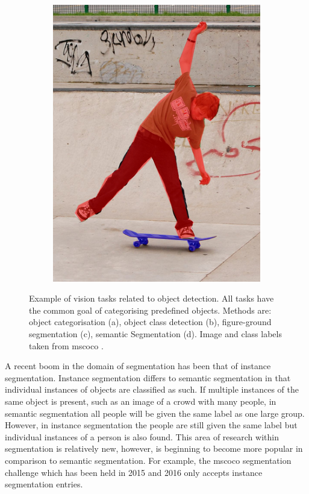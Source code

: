 \begin{figure}[H]
\begin{subfigure}[b]{0.2\textwidth}
        \includegraphics[width=\textwidth]{Figs/Problem/objfieldssegmentation.png}
        \caption{}\label{fig:objseg}
    \end{subfigure}
    \caption{Example of vision tasks related to object detection. All tasks have the common goal of categorising predefined objects. Methods are: object categorisation (a), object class detection (b), figure-ground segmentation (c), semantic Segmentation (d). Image and class labels taken from \gls{mscoco} \cite{mscoco}.}
    \label{fig:objfields}
\end{figure} 

A recent boom in the domain of segmentation has been that of instance segmentation. Instance segmentation differs to semantic segmentation in that individual instances of objects are classified as such. If multiple instances of the same object is present, such as an image of a crowd with many people, in semantic segmentation all people will be given the same label as one large group. However, in instance segmentation the people are still given the same label but individual instances of a person is also found. This area of research within segmentation is relatively new, however, is beginning to become more popular in comparison to semantic segmentation. For example, the \gls{mscoco} segmentation challenge which has been held in 2015 and 2016 only accepts instance segmentation entries.


